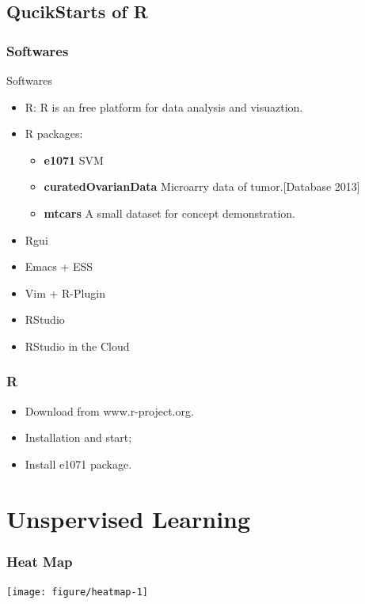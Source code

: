 \documentclass[UTF8]{beamer}\usepackage[]{graphicx}\usepackage[]{color}
\newenvironment{knitrout}{}{} %
\begin{document}
\subsection{QucikStarts of R}
\begin{frame}
  \frametitle{Softwares}
  \begin{block}{Softwares}
\begin{itemize}
\item R: R is an free platform for data analysis and visuaztion.
\item R packages:
\begin{itemize}
\item \textbf{e1071} SVM
\item \textbf{curatedOvarianData} Microarry data of tumor.[Database 2013]
\item \textbf{mtcars} A small dataset for concept demonstration.
\end{itemize}
\item Rgui
\item Emacs + ESS
\item Vim + R-Plugin
\item RStudio
\item RStudio in the Cloud
\end{itemize}
  \end{block}
\end{frame}

\begin{frame}
  \frametitle{R}
\begin{itemize}
  \item Download from www.r-project.org.
  \item Installation and start;
  \item Install e1071 package.
\end{itemize}
\end{frame}

\section{Unspervised Learning}

\begin{frame}[fragile]
  \frametitle{Heat Map}

\begin{knitrout}
\color{fgcolor}

{\centering \texttt{[image: figure/heatmap-1]} 

}



\end{knitrout}
\end{frame}
\end{document}

